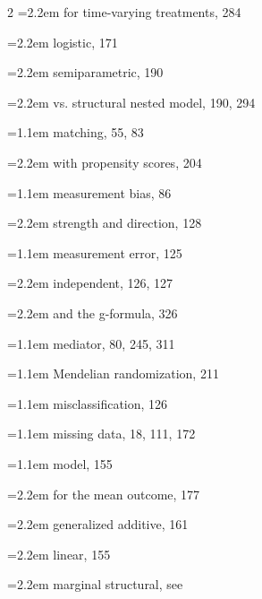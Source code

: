 \begin{multicols}{2}
\hspace*{1.1em}\hangindent=2.2em for time-varying treatments, 284\par
\hspace*{1.1em}\hangindent=2.2em logistic, 171\par
\hspace*{1.1em}\hangindent=2.2em semiparametric, 190\par
\hspace*{1.1em}\hangindent=2.2em vs. structural nested model, 190, 294\par
\hangindent=1.1em matching, 55, 83\par
\hspace*{1.1em}\hangindent=2.2em with propensity scores, 204\par
\hangindent=1.1em measurement bias, 86\par
\hspace*{1.1em}\hangindent=2.2em strength and direction, 128\par
\hangindent=1.1em measurement error, 125\par
\hspace*{1.1em}\hangindent=2.2em independent, 126, 127\par
\hspace*{1.1em}\hangindent=2.2em and the g-formula, 326\par
\hangindent=1.1em mediator, 80, 245, 311\par
\hangindent=1.1em Mendelian randomization, 211\par
\hangindent=1.1em misclassification, 126\par
\hangindent=1.1em missing data, 18, 111, 172\par
\hangindent=1.1em model, 155\par
\hspace*{1.1em}\hangindent=2.2em for the mean outcome, 177\par
\hspace*{1.1em}\hangindent=2.2em generalized additive, 161\par
\hspace*{1.1em}\hangindent=2.2em linear, 155\par
\hspace*{1.1em}\hangindent=2.2em marginal structural, see\par

\end{multicols}
